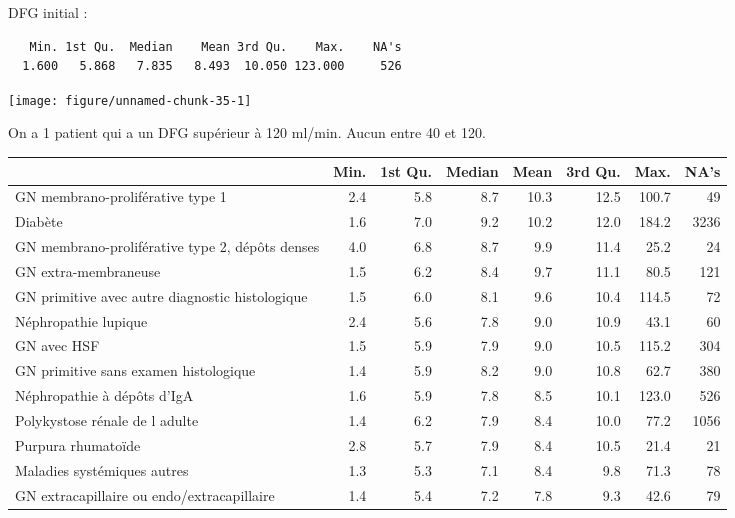 \documentclass[11pt,a4paper]{article}\usepackage[]{graphicx}\usepackage[]{color}
\makeatletter
\def\maxwidth{ %
  \ifdim\Gin@nat@width>\linewidth
    \linewidth
  \else
    \Gin@nat@width
  \fi
}
\newenvironment{kframe}{%
 \def\at@end@of@kframe{}%
 \ifinner\ifhmode%
  \def\at@end@of@kframe{\end{minipage}}%
  \begin{minipage}{\columnwidth}%
 \fi\fi%
 \def\FrameCommand##1{\hskip\@totalleftmargin \hskip-\fboxsep
 \colorbox{shadecolor}{##1}\hskip-\fboxsep
     \hskip-\linewidth \hskip-\@totalleftmargin \hskip\columnwidth}%
 \MakeFramed {\advance\hsize-\width
   \@totalleftmargin\z@ \linewidth\hsize
   \@setminipage}}%
 {\par\unskip\endMakeFramed%
 \at@end@of@kframe}
\newenvironment{knitrout}{}{} %
\makeatother
\begin{document}
DFG initial :


\begin{knitrout}
\color{fgcolor}\begin{kframe}
\begin{verbatim}
   Min. 1st Qu.  Median    Mean 3rd Qu.    Max.    NA's 
  1.600   5.868   7.835   8.493  10.050 123.000     526 
\end{verbatim}
\end{kframe}
\texttt{[image: figure/unnamed-chunk-35-1]} 

\end{knitrout}
On a 1 patient qui a un DFG supérieur à 120 ml/min. Aucun entre 40 et 120.

\begin{table}[H]
\centering
\begingroup\small
\begin{tabular}{lrrrrrrr}
  \hline
 & Min. & 1st Qu. & Median & Mean & 3rd Qu. & Max. & NA's \\ 
  \hline
GN membrano-proliférative type 1 & 2.4 & 5.8 & 8.7 & 10.3 & 12.5 & 100.7 & 49 \\ 
  Diabète & 1.6 & 7.0 & 9.2 & 10.2 & 12.0 & 184.2 & 3236 \\ 
  GN membrano-proliférative type 2, dépôts denses & 4.0 & 6.8 & 8.7 & 9.9 & 11.4 & 25.2 & 24 \\ 
  GN extra-membraneuse & 1.5 & 6.2 & 8.4 & 9.7 & 11.1 & 80.5 & 121 \\ 
  GN primitive avec autre diagnostic histologique & 1.5 & 6.0 & 8.1 & 9.6 & 10.4 & 114.5 & 72 \\ 
  Néphropathie lupique & 2.4 & 5.6 & 7.8 & 9.0 & 10.9 & 43.1 & 60 \\ 
  GN avec HSF & 1.5 & 5.9 & 7.9 & 9.0 & 10.5 & 115.2 & 304 \\ 
  GN primitive sans examen histologique & 1.4 & 5.9 & 8.2 & 9.0 & 10.8 & 62.7 & 380 \\ 
  Néphropathie à dépôts d'IgA & 1.6 & 5.9 & 7.8 & 8.5 & 10.1 & 123.0 & 526 \\ 
  Polykystose rénale de l adulte & 1.4 & 6.2 & 7.9 & 8.4 & 10.0 & 77.2 & 1056 \\ 
  Purpura rhumatoïde & 2.8 & 5.7 & 7.9 & 8.4 & 10.5 & 21.4 & 21 \\ 
  Maladies systémiques autres & 1.3 & 5.3 & 7.1 & 8.4 & 9.8 & 71.3 & 78 \\ 
  GN extracapillaire ou endo/extracapillaire & 1.4 & 5.4 & 7.2 & 7.8 & 9.3 & 42.6 & 79 \\ 
   \hline
\end{tabular}
\endgroup
\end{table}
\end{document}
